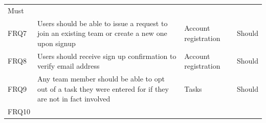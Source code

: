 \begin{longtable}[]{@{}llll@{}}
\begin{minipage}[t]{0.09\columnwidth}
Must\strut
\end{minipage}\tabularnewline
\begin{minipage}[t]{0.04\columnwidth}\raggedright\strut
FRQ7\strut
\end{minipage} & \begin{minipage}[t]{0.64\columnwidth}\raggedright\strut
Users should be able to issue a request to join an existing team or
create a new one upon signup\strut
\end{minipage} & \begin{minipage}[t]{0.12\columnwidth}\raggedright\strut
Account registration\strut
\end{minipage} & \begin{minipage}[t]{0.09\columnwidth}\raggedright\strut
Should\strut
\end{minipage}\tabularnewline
\begin{minipage}[t]{0.04\columnwidth}\raggedright\strut
FRQ8\strut
\end{minipage} & \begin{minipage}[t]{0.64\columnwidth}\raggedright\strut
Users should receive sign up confirmation to verify email address\strut
\end{minipage} & \begin{minipage}[t]{0.12\columnwidth}\raggedright\strut
Account registration\strut
\end{minipage} & \begin{minipage}[t]{0.09\columnwidth}\raggedright\strut
Should\strut
\end{minipage}\tabularnewline
\begin{minipage}[t]{0.04\columnwidth}\raggedright\strut
FRQ9\strut
\end{minipage} & \begin{minipage}[t]{0.64\columnwidth}\raggedright\strut
Any team member should be able to opt out of a task they were entered
for if they are not in fact involved\strut
\end{minipage} & \begin{minipage}[t]{0.12\columnwidth}\raggedright\strut
Tasks\strut
\end{minipage} & \begin{minipage}[t]{0.09\columnwidth}\raggedright\strut
Should\strut
\end{minipage}\tabularnewline
\begin{minipage}[t]{0.04\columnwidth}\raggedright\strut
FRQ10\strut
\end{minipage} & \begin{minipage}[t]{0.64\columnwidth}\raggedright\strut

\end{minipage}
\end{longtable}
